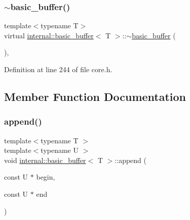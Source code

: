 \mbox{\label{classinternal_1_1basic__buffer_a3d5daba6aeecf79aeecdd4b7a8aee8ae}} 
\subsubsection{\texorpdfstring{$\sim$basic\+\_\+buffer()}{~basic\_buffer()}}
{\footnotesize\ttfamily template$<$typename T$>$ \\
virtual \hyperlink{classinternal_1_1basic__buffer}{internal\+::basic\+\_\+buffer}$<$ T $>$\+::$\sim$\hyperlink{classinternal_1_1basic__buffer}{basic\+\_\+buffer} (\begin{DoxyParamCaption}{ }\end{DoxyParamCaption})\hspace{0.3cm}{\ttfamily [inline]}, {\ttfamily [virtual]}}



Definition at line 244 of file core.\+h.



\subsection{Member Function Documentation}
\mbox{\label{classinternal_1_1basic__buffer_aba7ea1a95a28bc123712f2fd24cf7414}} 
\subsubsection{\texorpdfstring{append()}{append()}}
{\footnotesize\ttfamily template$<$typename T $>$ \\
template$<$typename U $>$ \\
void \hyperlink{classinternal_1_1basic__buffer}{internal\+::basic\+\_\+buffer}$<$ T $>$\+::append (\begin{DoxyParamCaption}\item[{const U $\ast$}]{begin,  }\item[{const U $\ast$}]{end }\end{DoxyParamCaption})}

